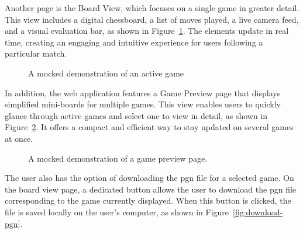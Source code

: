 Another page is the Board View, which focuses on a single game in greater detail. This view includes a digital chessboard, a list of moves played, a live camera feed, and a visual evaluation bar, as shown in Figure~\ref{fig:board-view-mocked}. The elements update in real time, creating an engaging and intuitive experience for users following a particular match. \\

\begin{figure}[h!] \centering {}\caption[Display of a board]{A mocked demonstration of an active game}\label{fig:board-view-mocked} \end{figure}

In addition, the web application features a Game Preview page that displays simplified mini-boards for multiple games. This view enables users to quickly glance through active games and select one to view in detail, as shown in Figure~\ref{fig:game-preview}. It offers a compact and efficient way to stay updated on several games at once. \\

\begin{figure}[h!] \centering {}\caption[Preview of active games]{A mocked demonstration of a game preview page.}\label{fig:game-preview} \end{figure}

The user also has the option of downloading the \gls{pgn} file for a selected game. On the board view page, a dedicated button allows the user to download the \gls{pgn} file corresponding to the game currently displayed. When this button is clicked, the file is saved locally on the user's computer, as shown in Figure~\ref{fig:download-pgn}. \\

